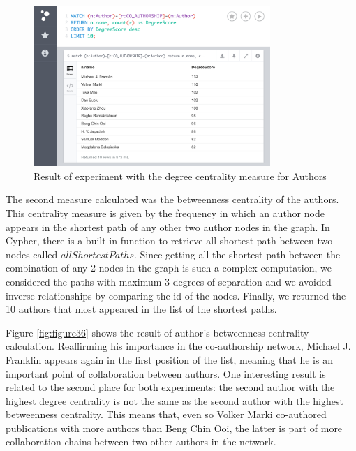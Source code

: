 \begin{figure}[!h]
\centering
\includegraphics[width=0.8\textwidth]{../exp_degree_centrality.png}
\caption{Result of experiment with the degree centrality measure for Authors}
\label{fig:figure35}
\end{figure}

The second measure calculated was the betweenness centrality of the authors. This centrality measure is given by the frequency in which an author node appears in the shortest path of any other two author nodes in the graph. In Cypher, there is a built-in function to retrieve all shortest path between two nodes called $allShortestPaths$. Since getting all the shortest path between the combination of any 2 nodes in the graph is such a complex computation, we considered the paths with maximum 3 degrees of separation and we avoided inverse relationships by comparing the id of the nodes. Finally, we returned the 10 authors that most appeared in the list of the shortest paths.

Figure \ref{fig:figure36} shows the result of author's betweenness centrality calculation. Reaffirming his importance in the co-authorship network, Michael J. Franklin appears again in the first position of the list, meaning that he is an important point of collaboration between authors. One interesting result is related to the second place for both experiments: the second author with the highest degree centrality is not the same as the second author with the highest betweenness centrality. This means that, even so Volker Marki co-authored publications with more authors than Beng Chin Ooi, the latter is part of more collaboration chains between two other authors in the network.

